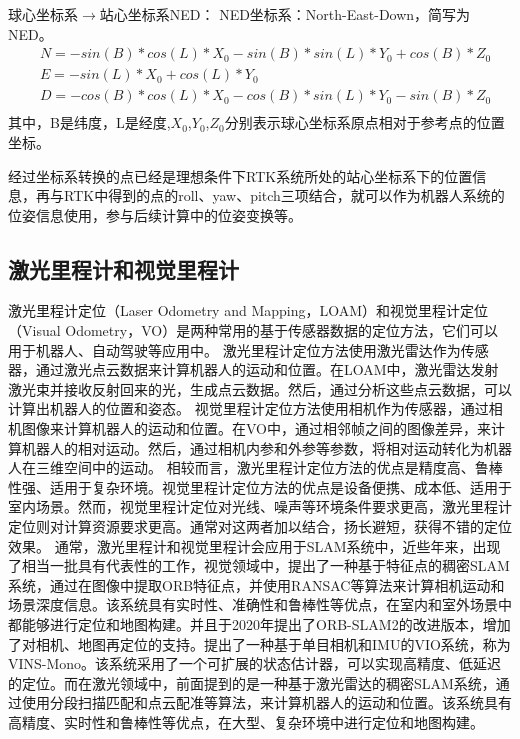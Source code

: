 球心坐标系$\longrightarrow$站心坐标系NED：
NED坐标系：North-East-Down，简写为NED。
\begin{equation}
    \begin{aligned}
    &N = -sin(B) * cos(L) * X_0 - sin(B) * sin(L) * Y_0 + cos(B) * Z_0\\
    &E = -sin(L) * X_0 + cos(L) * Y_0\\
   &D = -cos(B) * cos(L) * X_0 - cos(B) * sin(L) * Y_0 - sin(B) * Z_0\\
    \end{aligned}
\end{equation}
其中，B是纬度，L是经度,$X_0$,$Y_0$,$Z_0$分别表示球心坐标系原点相对于参考点的位置坐标。

经过坐标系转换的点已经是理想条件下RTK系统所处的站心坐标系下的位置信息，再与RTK中得到的点的roll、yaw、pitch三项结合，就可以作为机器人系统的位姿信息使用，参与后续计算中的位姿变换等。


\subsection{激光里程计和视觉里程计}
激光里程计定位（Laser Odometry and Mapping，LOAM）和视觉里程计定位（Visual Odometry，VO）是两种常用的基于传感器数据的定位方法，它们可以用于机器人、自动驾驶等应用中。
激光里程计定位方法使用激光雷达作为传感器，通过激光点云数据来计算机器人的运动和位置。在LOAM中，激光雷达发射激光束并接收反射回来的光，生成点云数据。然后，通过分析这些点云数据，可以计算出机器人的位置和姿态。
视觉里程计定位方法使用相机作为传感器，通过相机图像来计算机器人的运动和位置。在VO中，通过相邻帧之间的图像差异，来计算机器人的相对运动。然后，通过相机内参和外参等参数，将相对运动转化为机器人在三维空间中的运动。
相较而言，激光里程计定位方法的优点是精度高、鲁棒性强、适用于复杂环境。视觉里程计定位方法的优点是设备便携、成本低、适用于室内场景。然而，视觉里程计定位对光线、噪声等环境条件要求更高，激光里程计定位则对计算资源要求更高。通常对这两者加以结合，扬长避短，获得不错的定位效果。
通常，激光里程计和视觉里程计会应用于SLAM系统中，近些年来，出现了相当一批具有代表性的工作，视觉领域中，\citet{mur2017orb}提出了一种基于特征点的稠密SLAM系统，通过在图像中提取ORB特征点，并使用RANSAC等算法来计算相机运动和场景深度信息。该系统具有实时性、准确性和鲁棒性等优点，在室内和室外场景中都能够进行定位和地图构建。并且于2020年提出了ORB-SLAM2的改进版本，增加了对相机、地图再定位的支持。\citet{qin2018vins}提出了一种基于单目相机和IMU的VIO系统，称为VINS-Mono。该系统采用了一个可扩展的状态估计器，可以实现高精度、低延迟的定位。而在激光领域中，前面提到的\cite{shan2018lego}是一种基于激光雷达的稠密SLAM系统，通过使用分段扫描匹配和点云配准等算法，来计算机器人的运动和位置。该系统具有高精度、实时性和鲁棒性等优点，在大型、复杂环境中进行定位和地图构建。

